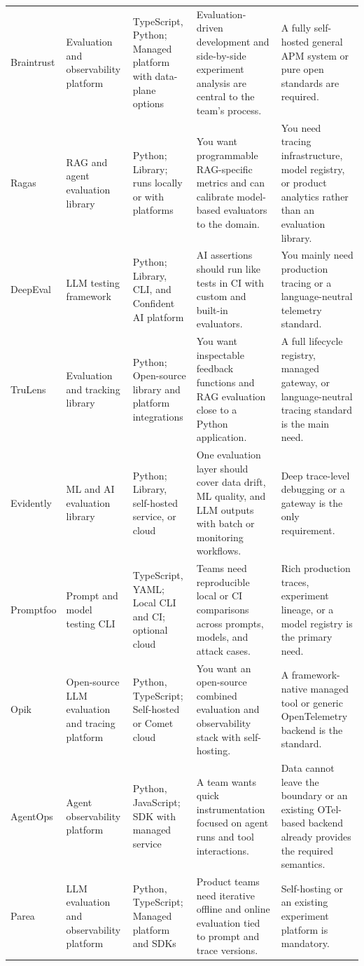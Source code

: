 \begin{longtable}{@{}p{20mm}p{22mm}p{26mm}p{46mm}p{46mm}@{}}
Braintrust & Evaluation and observability platform & TypeScript, Python; Managed platform with data-plane options & Evaluation-driven development and side-by-side experiment analysis are central to the team's process. & A fully self-hosted general APM system or pure open standards are required.\\
Ragas & RAG and agent evaluation library & Python; Library; runs locally or with platforms & You want programmable RAG-specific metrics and can calibrate model-based evaluators to the domain. & You need tracing infrastructure, model registry, or product analytics rather than an evaluation library.\\
DeepEval & LLM testing framework & Python; Library, CLI, and Confident AI platform & AI assertions should run like tests in CI with custom and built-in evaluators. & You mainly need production tracing or a language-neutral telemetry standard.\\
TruLens & Evaluation and tracking library & Python; Open-source library and platform integrations & You want inspectable feedback functions and RAG evaluation close to a Python application. & A full lifecycle registry, managed gateway, or language-neutral tracing standard is the main need.\\
Evidently & ML and AI evaluation library & Python; Library, self-hosted service, or cloud & One evaluation layer should cover data drift, ML quality, and LLM outputs with batch or monitoring workflows. & Deep trace-level debugging or a gateway is the only requirement.\\
Promptfoo & Prompt and model testing CLI & TypeScript, YAML; Local CLI and CI; optional cloud & Teams need reproducible local or CI comparisons across prompts, models, and attack cases. & Rich production traces, experiment lineage, or a model registry is the primary need.\\
Opik & Open-source LLM evaluation and tracing platform & Python, TypeScript; Self-hosted or Comet cloud & You want an open-source combined evaluation and observability stack with self-hosting. & A framework-native managed tool or generic OpenTelemetry backend is the standard.\\
AgentOps & Agent observability platform & Python, JavaScript; SDK with managed service & A team wants quick instrumentation focused on agent runs and tool interactions. & Data cannot leave the boundary or an existing OTel-based backend already provides the required semantics.\\
Parea & LLM evaluation and observability platform & Python, TypeScript; Managed platform and SDKs & Product teams need iterative offline and online evaluation tied to prompt and trace versions. & Self-hosting or an existing experiment platform is mandatory.\\

\end{longtable}

